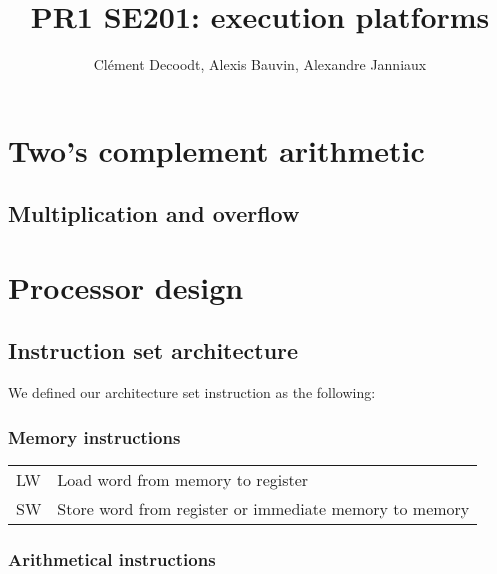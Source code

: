 \documentclass{report}
\author{Clément Decoodt, Alexis Bauvin, Alexandre Janniaux}
\title{PR1 SE201: execution platforms}
\begin{document}
\maketitle

\section{Two's complement arithmetic}

\subsection{}

\subsection{}

\subsection{}

\subsection{Multiplication and overflow}

\section{Processor design}

\subsection{Instruction set architecture}

We defined our architecture set instruction as the following:

\subsubsection{Memory instructions}

\begin{tabular}{@{}ll@{}}
    LW          & Load word from memory to register                      \\
    SW          & Store word from register or immediate memory to memory \\
\end{tabular}

\subsubsection{Arithmetical instructions}
\end{document}
